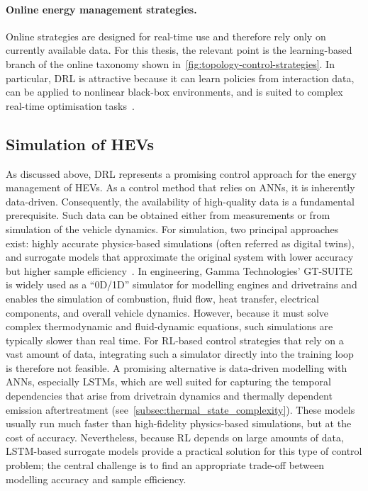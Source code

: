\paragraph{Online energy management strategies.}
Online strategies are designed for real-time use and therefore rely only on currently available data. For this thesis, the relevant point is the learning-based branch of the online taxonomy shown in~\autoref{fig:topology-control-strategies}. In particular, \ac{DRL} is attractive because it can learn policies from interaction data, can be applied to nonlinear black-box environments, and is suited to complex real-time optimisation tasks~\cite{tresca_cutting-edge_2025, zhou_self-learning_2022}.

\subsection{Simulation of HEVs}
\label{subsec:simulation_hevs}
As discussed above, DRL represents a promising control approach for the energy management of HEVs. As a control method that relies on \ac{ANN}s, it is inherently data-driven. Consequently, the availability of high-quality data is a fundamental prerequisite. Such data can be obtained either from measurements or from simulation of the vehicle dynamics. For simulation, two principal approaches exist: highly accurate physics-based simulations (often referred as digital twins), and surrogate models that approximate the original system with lower accuracy but higher sample efficiency~\cite{chakraborty_role_2021}. In engineering, Gamma Technologies' GT-SUITE~\cite{gamma_technologies_gt-suite_nodate} is widely used as a ``0D/1D'' simulator for modelling engines and drivetrains and enables the simulation of combustion, fluid flow, heat transfer, electrical components, and overall vehicle dynamics. However, because it must solve complex thermodynamic and fluid-dynamic equations, such simulations are typically slower than real time. For RL-based control strategies that rely on a vast amount of data, integrating such a simulator directly into the training loop is therefore not feasible. A promising alternative is data-driven modelling with \ac{ANN}s, especially \ac{LSTM}s, which are well suited for capturing the temporal dependencies that arise from drivetrain dynamics and thermally dependent emission aftertreatment (see~\autoref{subsec:thermal_state_complexity}). These models usually run much faster than high-fidelity physics-based simulations, but at the cost of accuracy. Nevertheless, because RL depends on large amounts of data, LSTM-based surrogate models provide a practical solution for this type of control problem; the central challenge is to find an appropriate trade-off between modelling accuracy and sample efficiency.

